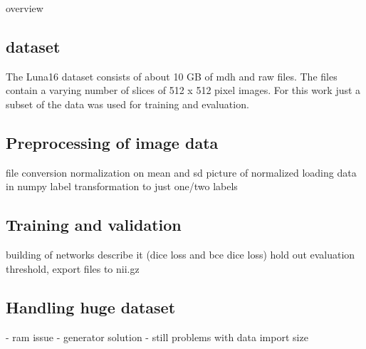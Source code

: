 
overview

\subsection{dataset}
The Luna16 dataset consists of about 10 GB of mdh and raw files. The files contain a varying number of slices of 512 x 512 pixel images. For this work just a subset of the data was used for training and evaluation.

\subsection{Preprocessing of image data}
file conversion
normalization on mean and sd
picture of normalized
loading data in numpy
label transformation to just one/two labels

\subsection{Training and validation}

building of networks
describe it (dice loss and bce dice loss)
hold out evaluation
threshold, export files to nii.gz

\subsection{Handling huge dataset}
- ram issue
- generator solution
- still problems with data import size




